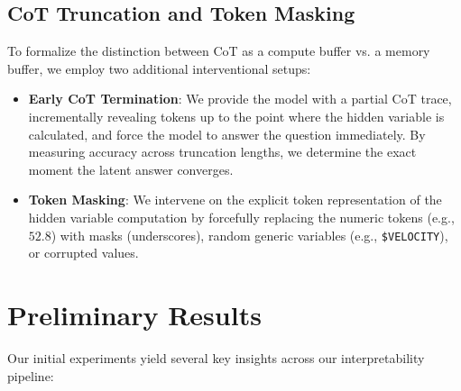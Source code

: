 \documentclass[11pt]{article}
\begin{document}
\subsection{CoT Truncation and Token Masking}

To formalize the distinction between CoT as a compute buffer vs. a memory buffer, we employ two additional interventional setups:
\begin{itemize}
    \item \textbf{Early CoT Termination}: We provide the model with a partial CoT trace, incrementally revealing tokens up to the point where the hidden variable is calculated, and force the model to answer the question immediately. By measuring accuracy across truncation lengths, we determine the exact moment the latent answer converges.
    \item \textbf{Token Masking}: We intervene on the explicit token representation of the hidden variable computation by forcefully replacing the numeric tokens (e.g., $52.8$) with masks (underscores), random generic variables (e.g., \texttt{\$VELOCITY}), or corrupted values. 
\end{itemize}

\section{Preliminary Results}

Our initial experiments yield several key insights across our interpretability pipeline:
\end{document}
